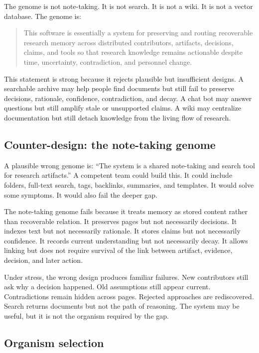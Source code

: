 \documentclass[11pt]{article}
\begin{document}
The genome is not note-taking. It is not search. It is not a wiki. It is not a vector database. The genome is:

\begin{quote}
This software is essentially a system for preserving and routing recoverable research memory across distributed contributors, artifacts, decisions, claims, and tools so that research knowledge remains actionable despite time, uncertainty, contradiction, and personnel change.
\end{quote}

This statement is strong because it rejects plausible but insufficient designs. A searchable archive may help people find documents but still fail to preserve decisions, rationale, confidence, contradiction, and decay. A chat bot may answer questions but still amplify stale or unsupported claims. A wiki may centralize documentation but still detach knowledge from the living flow of research.

\subsection{Counter-design: the note-taking genome}

A plausible wrong genome is: ``The system is a shared note-taking and search tool for research artifacts.'' A competent team could build this. It could include folders, full-text search, tags, backlinks, summaries, and templates. It would solve some symptoms. It would also fail the deeper gap.

The note-taking genome fails because it treats memory as stored content rather than recoverable relation. It preserves pages but not necessarily decisions. It indexes text but not necessarily rationale. It stores claims but not necessarily confidence. It records current understanding but not necessarily decay. It allows linking but does not require survival of the link between artifact, evidence, decision, and later action.

Under stress, the wrong design produces familiar failures. New contributors still ask why a decision happened. Old assumptions still appear current. Contradictions remain hidden across pages. Rejected approaches are rediscovered. Search returns documents but not the path of reasoning. The system may be useful, but it is not the organism required by the gap.

\subsection{Organism selection}
\end{document}
